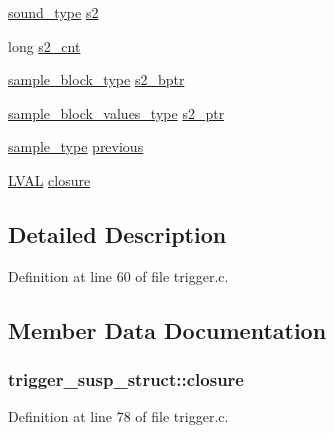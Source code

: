 \begin{DoxyCompactItemize}
\hyperlink{sound_8h_a792cec4ed9d6d636d342d9365ba265ea}{sound\+\_\+type} \hyperlink{structtrigger__susp__struct_ab93a5169f15a43905f20c51bab3e6269}{s2}
\item 
long \hyperlink{structtrigger__susp__struct_ac168c6056dfda37922b834c40b479e36}{s2\+\_\+cnt}
\item 
\hyperlink{sound_8h_a6becaef7eb98c0e45b13f72dadf07b23}{sample\+\_\+block\+\_\+type} \hyperlink{structtrigger__susp__struct_a89553adef63f0e1709f7b585eca7c81b}{s2\+\_\+bptr}
\item 
\hyperlink{sound_8h_a83d17f7b465d1591f27cd28fc5eb8a03}{sample\+\_\+block\+\_\+values\+\_\+type} \hyperlink{structtrigger__susp__struct_af9185f2abeb7f0e13f6022f0938dbc55}{s2\+\_\+ptr}
\item 
\hyperlink{sound_8h_a3a9d1d4a1c153390d2401a6e9f71b32c}{sample\+\_\+type} \hyperlink{structtrigger__susp__struct_a2cf206838b659e8da0fd9eb7b49e5212}{previous}
\item 
\hyperlink{xldmem_8h_a9a9ec6a5fbca2b40ed8d19faa799be8c}{L\+V\+AL} \hyperlink{structtrigger__susp__struct_a67a620ab54b72d4e60321fd6bed8ecad}{closure}
\end{DoxyCompactItemize}


\subsection{Detailed Description}


Definition at line 60 of file trigger.\+c.



\subsection{Member Data Documentation}
\subsubsection[{\texorpdfstring{closure}{closure}}]{ trigger\+\_\+susp\+\_\+struct\+::closure}\hypertarget{structtrigger__susp__struct_a67a620ab54b72d4e60321fd6bed8ecad}{}\label{structtrigger__susp__struct_a67a620ab54b72d4e60321fd6bed8ecad}


Definition at line 78 of file trigger.\+c.


